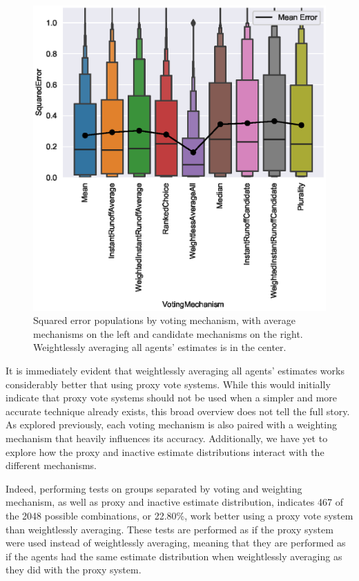 \begin{figure}[htbp]
    \centering
    \includegraphics[scale=0.75]
    {./content/figures/weightless/weightless_voting_mechanisms_comparison}
    \caption{Squared error populations by voting mechanism, with average
    mechanisms on the left and candidate mechanisms on the right.
    Weightlessly averaging all agents' estimates is in the center.}
    \label{fig:weightless-voting-mechanisms-comparison}
\end{figure}

It is immediately evident that weightlessly averaging all agents' estimates works
considerably better that using proxy vote systems.
While this would initially indicate that proxy vote systems should not be used when a
simpler and more accurate technique already exists, this broad overview does not tell
the full story.
As explored previously, each voting mechanism is also paired with a weighting
mechanism that heavily influences its accuracy.
Additionally, we have yet to explore how the proxy and inactive estimate
distributions interact with the different mechanisms.

Indeed, performing tests on groups separated by voting and weighting mechanism, as
well as proxy and inactive estimate distribution, indicates 467 of the 2048 possible
combinations, or 22.80\%, work better using a proxy vote system than weightlessly
averaging.
These tests are performed as if the proxy system were used instead of weightlessly
averaging, meaning that they are performed as if the agents had the same estimate
distribution when weightlessly averaging as they did with the proxy system.

